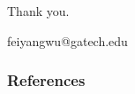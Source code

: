 \documentclass[handout]{beamer}
\begin{document}
\begin{frame}
    \frametitle{}
    \centering
    
    \Large\color{gtblue}
    Thank you.

    \vspace{0.5cm}
    feiyangwu@gatech.edu

\end{frame}


\begin{frame}[allowframebreaks]
\frametitle{References}
\footnotesize

\end{frame}

\end{document}
